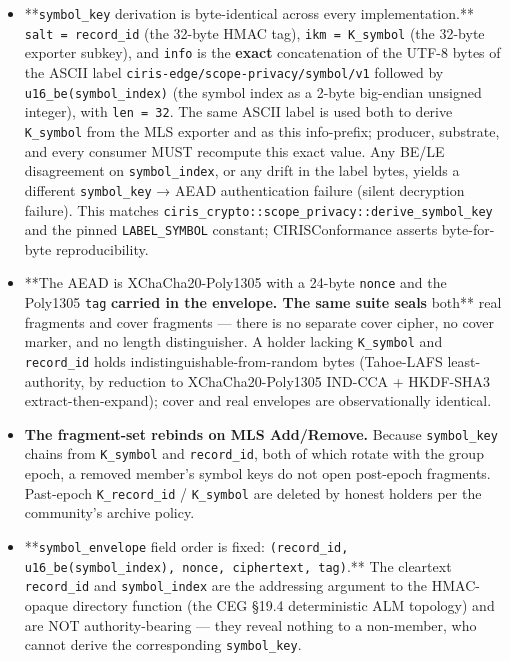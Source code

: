 \documentclass[11pt]{article}
\begin{document}
\begin{itemize}\setlength\itemsep{0pt}
\item **\texttt{symbol\_key} derivation is byte-identical across every implementation.** \texttt{salt = record\_id} (the 32-byte HMAC tag), \texttt{ikm = K\_symbol} (the 32-byte exporter subkey), and \texttt{info} is the \textbf{exact} concatenation of the UTF-8 bytes of the ASCII label \texttt{ciris-edge/scope-privacy/symbol/v1} followed by \texttt{u16\_be(symbol\_index)} (the symbol index as a 2-byte big-endian unsigned integer), with \texttt{len = 32}. The same ASCII label is used both to derive \texttt{K\_symbol} from the MLS exporter and as this info-prefix; producer, substrate, and every consumer MUST recompute this exact value. Any BE/LE disagreement on \texttt{symbol\_index}, or any drift in the label bytes, yields a different \texttt{symbol\_key} → AEAD authentication failure (silent decryption failure). This matches \texttt{ciris\_crypto::scope\_privacy::derive\_symbol\_key} and the pinned \texttt{LABEL\_SYMBOL} constant; CIRISConformance asserts byte-for-byte reproducibility.
\item **The AEAD is XChaCha20-Poly1305 with a 24-byte \texttt{nonce} and the Poly1305 \texttt{tag}\textbf{ carried in the envelope. The same suite seals }both** real fragments and cover fragments — there is no separate cover cipher, no cover marker, and no length distinguisher. A holder lacking \texttt{K\_symbol} and \texttt{record\_id} holds indistinguishable-from-random bytes (Tahoe-LAFS least-authority, by reduction to XChaCha20-Poly1305 IND-CCA + HKDF-SHA3 extract-then-expand); cover and real envelopes are observationally identical.
\item \textbf{The fragment-set rebinds on MLS Add/Remove.} Because \texttt{symbol\_key} chains from \texttt{K\_symbol} and \texttt{record\_id}, both of which rotate with the group epoch, a removed member's symbol keys do not open post-epoch fragments. Past-epoch \texttt{K\_record\_id} / \texttt{K\_symbol} are deleted by honest holders per the community's archive policy.
\item **\texttt{symbol\_envelope} field order is fixed: \texttt{(record\_id, u16\_be(symbol\_index), nonce, ciphertext, tag)}.** The cleartext \texttt{record\_id} and \texttt{symbol\_index} are the addressing argument to the HMAC-opaque directory function (the CEG §19.4 deterministic ALM topology) and are NOT authority-bearing — they reveal nothing to a non-member, who cannot derive the corresponding \texttt{symbol\_key}.
\end{itemize}
\end{document}

